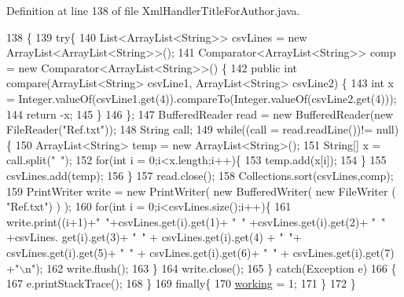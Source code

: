 Definition at line 138 of file Xml\-Handler\-Title\-For\-Author.\-java.


\begin{DoxyCode}
138                       \{
139         \textcolor{keywordflow}{try}\{
140             List<ArrayList<String>> csvLines = \textcolor{keyword}{new} ArrayList<ArrayList<String>>();
141             Comparator<ArrayList<String>> comp = \textcolor{keyword}{new} Comparator<ArrayList<String>>() \{
142                 \textcolor{keyword}{public} \textcolor{keywordtype}{int} compare(ArrayList<String> csvLine1, ArrayList<String> csvLine2) \{
143                     \textcolor{keywordtype}{int} x = Integer.valueOf(csvLine1.get(4)).compareTo(Integer.valueOf(csvLine2.get(4)));
144                     \textcolor{keywordflow}{return} -x;
145                 \}
146             \};
147             BufferedReader read = \textcolor{keyword}{new} BufferedReader(\textcolor{keyword}{new} FileReader(\textcolor{stringliteral}{"Ref.txt"}));
148             String call;
149             \textcolor{keywordflow}{while}((call = read.readLine())!= null)\{
150             ArrayList<String> temp = \textcolor{keyword}{new} ArrayList<String>();
151             String[] x = call.split(\textcolor{stringliteral}{"~"});
152             \textcolor{keywordflow}{for}(\textcolor{keywordtype}{int} i = 0;i<x.length;i++)\{
153                 temp.add(x[i]);
154             \}
155             csvLines.add(temp);
156             \}
157             read.close();
158             Collections.sort(csvLines,comp);
159             PrintWriter write = \textcolor{keyword}{new} PrintWriter( \textcolor{keyword}{new} BufferedWriter( \textcolor{keyword}{new} FileWriter ( \textcolor{stringliteral}{"Ref.txt"}) ) );
160             \textcolor{keywordflow}{for}(\textcolor{keywordtype}{int} i = 0;i<csvLines.size();i++)\{
161                 write.print((i+1)+\textcolor{stringliteral}{"~"}+csvLines.get(i).get(1)+ \textcolor{stringliteral}{"~"} +csvLines.get(i).get(2)+ \textcolor{stringliteral}{"~"} +csvLines.
      get(i).get(3)+ \textcolor{stringliteral}{"~"} + csvLines.get(i).get(4) + \textcolor{stringliteral}{"~"}+ csvLines.get(i).get(5)+ \textcolor{stringliteral}{"~"} + csvLines.get(i).get(6)+ \textcolor{stringliteral}{"~"} +
       csvLines.get(i).get(7) +\textcolor{stringliteral}{"\(\backslash\)n"});
162                 write.flush();
163             \}
164             write.close();
165         \}   \textcolor{keywordflow}{catch}(Exception e)
166         \{
167             e.printStackTrace();
168         \}
169         \textcolor{keywordflow}{finally}\{
170             \hyperlink{classXmlHandlerTitleForAuthor_aacfb0b6097f6d67493b600563cc91ec7}{working} = 1;
171         \}
172         \}
\end{DoxyCode}


